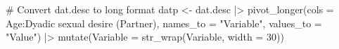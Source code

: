 \documentclass[
  bookmarksnumbered]{article}
\newenvironment{Shaded}{\begin{snugshade}}{\end{snugshade}}
\newcommand{\AttributeTok}[1]{\textcolor[rgb]{0.80,0.80,0.80}{#1}}
\newcommand{\CommentTok}[1]{\textcolor[rgb]{0.50,0.62,0.50}{#1}}
\newcommand{\DecValTok}[1]{\textcolor[rgb]{0.86,0.86,0.80}{#1}}
\newcommand{\FunctionTok}[1]{\textcolor[rgb]{0.94,0.94,0.56}{#1}}
\newcommand{\NormalTok}[1]{\textcolor[rgb]{0.80,0.80,0.80}{#1}}
\newcommand{\OtherTok}[1]{\textcolor[rgb]{0.94,0.94,0.56}{#1}}
\newcommand{\SpecialCharTok}[1]{\textcolor[rgb]{0.86,0.64,0.64}{#1}}
\newcommand{\StringTok}[1]{\textcolor[rgb]{0.80,0.58,0.58}{#1}}
\begin{document}
\begin{Shaded}
\begin{Highlighting}[]
\CommentTok{\# Convert dat.desc to long format}
\NormalTok{datp }\OtherTok{\textless{}{-}}\NormalTok{ dat.desc }\SpecialCharTok{|\textgreater{}} 
  \FunctionTok{pivot\_longer}\NormalTok{(}\AttributeTok{cols =}\NormalTok{ Age}\SpecialCharTok{:}\StringTok{\textasciigrave{}}\AttributeTok{Dyadic sexual desire (Partner)}\StringTok{\textasciigrave{}}\NormalTok{,}
               \AttributeTok{names\_to =} \StringTok{"Variable"}\NormalTok{, }
               \AttributeTok{values\_to =} \StringTok{"Value"}\NormalTok{) }\SpecialCharTok{|\textgreater{}}
  \FunctionTok{mutate}\NormalTok{(}\AttributeTok{Variable =} \FunctionTok{str\_wrap}\NormalTok{(Variable, }\AttributeTok{width =} \DecValTok{30}\NormalTok{))}


\end{Highlighting}
\end{Shaded}
\end{document}
